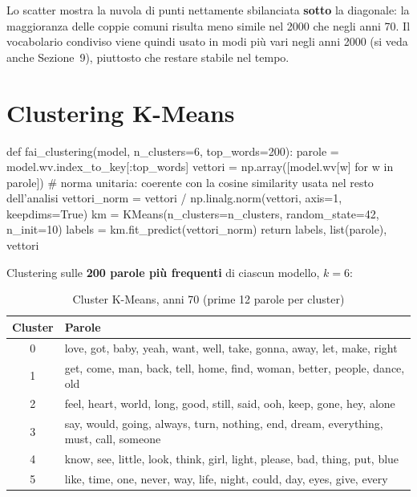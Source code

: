 \documentclass[12pt,a4paper]{article}
\begin{document}
Lo scatter mostra la nuvola di punti nettamente sbilanciata \textbf{sotto} la diagonale: la maggioranza delle coppie comuni risulta meno simile nel 2000 che negli anni 70. Il vocabolario condiviso viene quindi usato in modi pi\`u vari negli anni 2000 (si veda anche Sezione~9), piuttosto che restare stabile nel tempo.

\section{Clustering K-Means}

\begin{pylisting}[title={Clustering K-Means sulle top 200 parole}]
def fai_clustering(model, n_clusters=6, top_words=200):
    parole  = model.wv.index_to_key[:top_words]
    vettori = np.array([model.wv[w] for w in parole])
    # norma unitaria: coerente con la cosine similarity usata nel resto dell'analisi
    vettori_norm = vettori / np.linalg.norm(vettori, axis=1, keepdims=True)
    km      = KMeans(n_clusters=n_clusters, random_state=42, n_init=10)
    labels  = km.fit_predict(vettori_norm)
    return labels, list(parole), vettori
\end{pylisting}

Clustering sulle \textbf{200 parole pi\`u frequenti} di ciascun modello, $k=6$:

\begin{table}[H]
  \centering
  \caption{Cluster K-Means, anni 70 (prime 12 parole per cluster)}
  \small
  \begin{tabular}{c>{\raggedright\arraybackslash}p{11.5cm}}
    \toprule
    \textbf{Cluster} & \textbf{Parole} \\
    \midrule
    0 & love, got, baby, yeah, want, well, take, gonna, away, let, make, right \\
    1 & get, come, man, back, tell, home, find, woman, better, people, dance, old \\
    2 & feel, heart, world, long, good, still, said, ooh, keep, gone, hey, alone \\
    3 & say, would, going, always, turn, nothing, end, dream, everything, must, call, someone \\
    4 & know, see, little, look, think, girl, light, please, bad, thing, put, blue \\
    5 & like, time, one, never, way, life, night, could, day, eyes, give, every \\
    \bottomrule
  \end{tabular}
\end{table}
\end{document}
